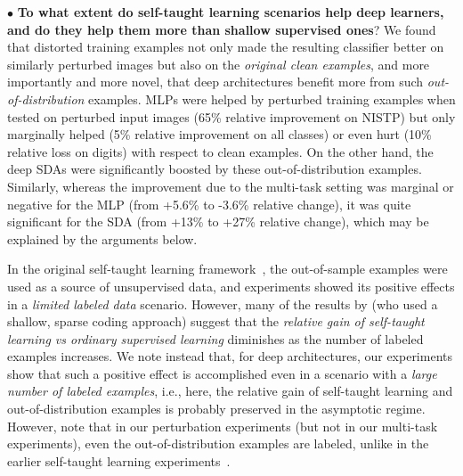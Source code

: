 \documentclass{article} %
\begin{document}
$\bullet$ %
{\bf To what extent do self-taught learning scenarios help deep learners,
and do they help them more than shallow supervised ones}?
We found that distorted training examples not only made the resulting
classifier better on similarly perturbed images but also on
the {\em original clean examples}, and more importantly and more novel,
that deep architectures benefit more from such {\em out-of-distribution}
examples. MLPs were helped by perturbed training examples when tested on perturbed input 
images (65\% relative improvement on NISTP) 
but only marginally helped (5\% relative improvement on all classes) 
or even hurt (10\% relative loss on digits)
with respect to clean examples. On the other hand, the deep SDAs
were significantly boosted by these out-of-distribution examples.
Similarly, whereas the improvement due to the multi-task setting was marginal or
negative for the MLP (from +5.6\% to -3.6\% relative change), 
it was quite significant for the SDA (from +13\% to +27\% relative change),
which may be explained by the arguments below.

In the original self-taught learning framework~\citep{RainaR2007}, the
out-of-sample examples were used as a source of unsupervised data, and
experiments showed its positive effects in a \emph{limited labeled data}
scenario. However, many of the results by \citet{RainaR2007} (who used a
shallow, sparse coding approach) suggest that the {\em relative gain of self-taught
learning vs ordinary supervised learning} diminishes as the number of labeled examples increases.
We note instead that, for deep
architectures, our experiments show that such a positive effect is accomplished
even in a scenario with a \emph{large number of labeled examples},
i.e., here, the relative gain of self-taught learning and
out-of-distribution examples is probably preserved
in the asymptotic regime. However, note that in our perturbation experiments
(but not in our multi-task experiments), 
even the out-of-distribution examples are labeled, unlike in the
earlier self-taught learning experiments~\citep{RainaR2007}.
\end{document}
